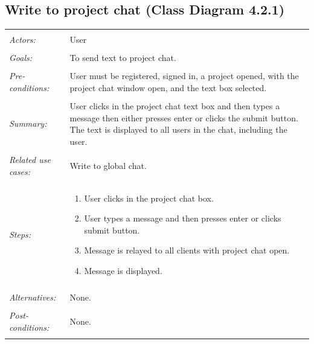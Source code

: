 \documentclass[11pt]{report}
\begin{document}
\subsection{Write to project chat (Class Diagram 4.2.1)}
\begin{tabular}{ p{2cm} p{12cm} }
 \hline
 \\
 \textit{Actors:} & User \\ 
 \\
 \textit{Goals:} & To send text to project chat. \\
 \\
 \textit{Pre-conditions:} & User must be registered, signed in, a project opened, with the project chat window open, and the text box selected.  \\
 \\
 \textit{Summary:} & User clicks in the project chat text box and then types a message then either presses enter or clicks the submit button. The text is displayed to all users in the chat, including the user. \\ 
 \\
 \textit{Related use cases:} & Write to global chat. \\ 
 \\
 \textit{Steps:} & \begin{enumerate}
  \item User clicks in the project chat box.
  \item User types a message and then presses enter or clicks submit button.
  \item Message is relayed to all clients with project chat open.
  \item Message is displayed.
 \end{enumerate} \\
 \\
 \textit{Alternatives:} & None. \\
 \\
 \textit{Post-conditions:} & None. \\
 \\
\hline
\end{tabular}
\end{document}
